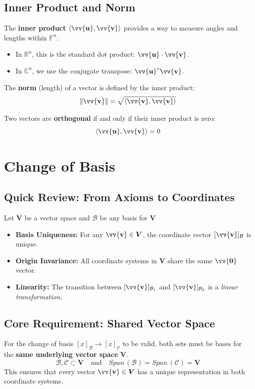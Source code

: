 \documentclass[11pt]{article}
\DeclareRobustCommand{\myvec}[1]{\vv{\mathbf{#1}}}
\newcommand{\mysubvecsp}[1]{\bm{{#1}}}
\newcommand{\myset}[1]{\mathcal{#1}}
\begin{document}
    \subsection{Inner Product and Norm}
    The \textbf{inner product} $\langle \myvec{u}, \myvec{v} \rangle$ provides a way to measure angles and lengths within $\mathbb{F}^n$. 
    \begin{itemize}
        \item In $\mathbb{R}^n$, this is the standard dot product: $\myvec{u} \cdot \myvec{v}$.
        \item In $\mathbb{C}^n$, we use the conjugate transpose: $\myvec{u}^* \myvec{v}$.
    \end{itemize}

    The \textbf{norm} (length) of a vector is defined by the inner product:
    \begin{equation}
        \|\myvec{v}\| = \sqrt{\langle \myvec{v}, \myvec{v} \rangle}
    \end{equation}

    Two vectors are \textbf{orthogonal} if and only if their inner product is zero:
    \begin{equation}
        \langle \myvec{u}, \myvec{v} \rangle = 0
    \end{equation}

    \newpage
    \section{Change of Basis}
    \subsection*{Quick Review: From Axioms to Coordinates}
    Let $\mysubvecsp{V}$ be a vector space and $\myset{B}$ be any basis for $\mysubvecsp{V}$
    \begin{itemize}
        \item \textbf{Basis Uniqueness:} For any $\myvec{v} \in \mysubvecsp{V}$, the coordinate vector $[\myvec{v}]_\myset{B}$ is unique.
        \item \textbf{Origin Invariance:} All coordinate systems in $\mysubvecsp{V}$ share the same $\myvec{0}$ vector.
        \item \textbf{Linearity:} The transition between $[\myvec{v}]_{\mathcal{B}_1}$ and $[\myvec{v}]_{\mathcal{B}_2}$ is a \textit{linear transformation}. 
    \end{itemize}
    \subsection{Core Requirement: Shared Vector Space}
    For the change of basis $[x]_\myset{B} \to [x]_\myset{C}$ to be valid, both sets must be bases for the \textbf{same underlying vector space} $\mysubvecsp{V}$. 
    \begin{equation}
        \myset{B}, \myset{C} \subset \mysubvecsp{V} \quad \text{and} \quad Span\,(\myset{B}) = Span\,(\myset{C}) = \mysubvecsp{V}
    \end{equation}
    This ensures that every vector $\myvec{v} \in \mysubvecsp{V}$ has a unique representation in both coordinate systems.
\end{document}
